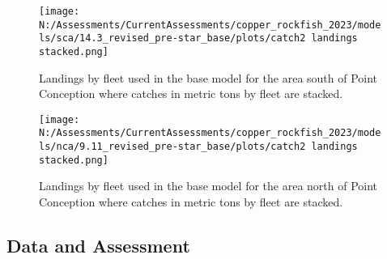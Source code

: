 \documentclass[11pt,
  english,
  letterpaper,
]{article}
\begin{document}
\begin{figure}
\centering
\texttt{[image: N:/Assessments/CurrentAssessments/copper\_rockfish\_2023/models/sca/14.3\_revised\_pre-star\_base/plots/catch2 landings stacked.png]}
\caption{Landings by fleet used in the base model for the area south of Point Conception where catches in metric tons by fleet are stacked.\label{fig:es-south-catch}}
\end{figure}

\begin{figure}
\centering
\texttt{[image: N:/Assessments/CurrentAssessments/copper\_rockfish\_2023/models/nca/9.11\_revised\_pre-star\_base/plots/catch2 landings stacked.png]}
\caption{Landings by fleet used in the base model for the area north of Point Conception where catches in metric tons by fleet are stacked.\label{fig:es-north-catch}}
\end{figure}

\pagebreak

\hypertarget{data-and-assessment}{%
\subsection*{Data and Assessment}\label{data-and-assessment}}
\end{document}
